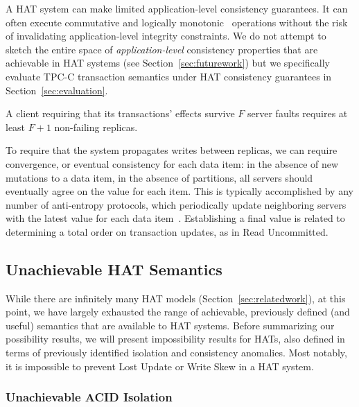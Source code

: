 \vspace{0.5em}
 A HAT system can make limited
application-level consistency guarantees. It can often execute
commutative and logically monotonic~\cite{calm} operations without the
risk of invalidating application-level integrity constraints. We do
not attempt to sketch the entire space of \textit{application-level}
consistency properties that are achievable in HAT systems (see
Section~\ref{sec:futurework}) but we specifically evaluate TPC-C
transaction semantics under HAT consistency guarantees in
Section~\ref{sec:evaluation}.

\vspace{.5em} A client requiring that its
transactions' effects survive $F$ server faults requires at least
$F+1$ non-failing replicas.

\vspace{.5em} To require that the
system propagates writes between replicas, we can require convergence,
or eventual consistency for each data item: in the absence of new
mutations to a data item, in the absence of partitions, all servers
should eventually agree on the value for each item. This is typically
accomplished by any number of anti-entropy protocols, which
periodically update neighboring servers with the latest value for each
data item~\cite{antientropy}. Establishing a final value is related to
determining a total order on transaction updates, as in Read
Uncommitted.

\subsection{Unachievable HAT Semantics}
\label{sec:unachievable-hat}

While there are infinitely many HAT models
(Section~\ref{sec:relatedwork}), at this point, we have largely
exhausted the range of achievable, previously defined (and useful)
semantics that are available to HAT systems. Before summarizing our
possibility results, we will present impossibility results for HATs,
also defined in terms of previously identified isolation and
consistency anomalies. Most notably, it is impossible to
prevent Lost Update or Write Skew in a HAT system.

\subsubsection{Unachievable ACID Isolation}

